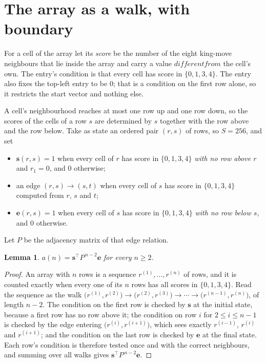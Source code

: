 \documentclass[11pt,a4paper]{article}
\theoremstyle{plain}
\newtheorem{lemma}[theorem]{Lemma}
\theoremstyle{definition}
\begin{document}
\section{The array as a walk, with boundary}

For a cell of the array let its \emph{score} be the number of the eight king-move neighbours that lie inside
the array and carry a value $different from$ the cell's own. The entry's condition is that every cell
has score in $\{0,1,3,4\}$. The entry also fixes the top-left entry to be $0$; that is a condition on the first row alone, so it restricts the start vector and nothing else.

A cell's neighbourhood reaches at most one row up and one row down, so the scores of the
cells of a row $s$ are determined by $s$ together with the row above and the row below.
Take as state an ordered pair $(r,s)$ of rows, so $S=256$, and set
\begin{itemize}
\item $\mathbf{s}(r,s)=1$ when every cell of $r$ has score in $\{0,1,3,4\}$ \emph{with no row
above $r$} and $r_1=0$, and $0$ otherwise;
\item an edge $(r,s)\to(s,t)$ when every cell of $s$ has score in $\{0,1,3,4\}$ computed from
$r$, $s$ and $t$;
\item $\mathbf{e}(r,s)=1$ when every cell of $s$ has score in $\{0,1,3,4\}$ \emph{with no row
below $s$}, and $0$ otherwise.
\end{itemize}
Let $P$ be the adjacency matrix of that edge relation.

\begin{lemma}\label{lem:walk}
$a(n)=\mathbf{s}^{\!\top}P^{\,n-2}\mathbf{e}$ for every $n\ge2$.
\end{lemma}

\begin{proof}
An array with $n$ rows is a sequence $r^{(1)},\dots,r^{(n)}$ of rows, and it is counted
exactly when every one of its $n$ rows has all scores in $\{0,1,3,4\}$. Read the sequence as the
walk $\bigl(r^{(1)},r^{(2)}\bigr)\to\bigl(r^{(2)},r^{(3)}\bigr)\to\cdots\to
\bigl(r^{(n-1)},r^{(n)}\bigr)$, of length $n-2$. The condition on the first row is
checked by $\mathbf{s}$ at the initial state, because a first row has no row above it; the
condition on row $i$ for $2\le i\le n-1$ is checked by the edge entering
$\bigl(r^{(i)},r^{(i+1)}\bigr)$, which sees exactly $r^{(i-1)}$, $r^{(i)}$ and
$r^{(i+1)}$; and the condition on the last row is checked by $\mathbf{e}$ at the final
state. Each row's condition is therefore tested once and with the correct neighbours, and
summing over all walks gives $\mathbf{s}^{\!\top}P^{\,n-2}\mathbf{e}$.
\end{proof}
\end{document}
